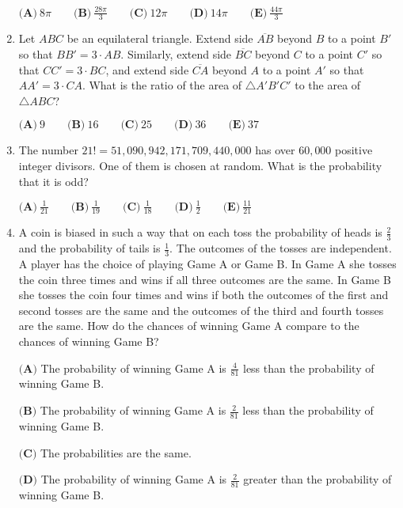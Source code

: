 \documentclass{article}
\begin{document}
\begin{enumerate}[label=\arabic*., itemsep=0.5em]
\(\textbf{(A)}\ 8\pi \qquad \textbf{(B)}\ \frac{28\pi}{3} \qquad \textbf{(C)}\ 12\pi \qquad \textbf{(D)}\ 14\pi \qquad \textbf{(E)}\ \frac{44\pi}{3}\)\par \vspace{0.5em}\item Let \(ABC\) be an equilateral triangle. Extend side \(\overline{AB}\) beyond \(B\) to a point \(B'\) so that \(BB'=3 \cdot AB\). Similarly, extend side \(\overline{BC}\) beyond \(C\) to a point \(C'\) so that \(CC'=3 \cdot BC\), and extend side \(\overline{CA}\) beyond \(A\) to a point \(A'\) so that \(AA'=3 \cdot CA\). What is the ratio of the area of \(\triangle A'B'C'\) to the area of \(\triangle ABC\)?

\(\textbf{(A)}\ 9\qquad\textbf{(B)}\ 16\qquad\textbf{(C)}\ 25\qquad\textbf{(D)}\ 36\qquad\textbf{(E)}\ 37\)\par \vspace{0.5em}\item The number \(21!=51,090,942,171,709,440,000\) has over \(60,000\) positive integer divisors. One of them is chosen at random. What is the probability that it is odd?

\(\textbf{(A)}\ \frac{1}{21} \qquad \textbf{(B)}\ \frac{1}{19} \qquad \textbf{(C)}\ \frac{1}{18} \qquad \textbf{(D)}\ \frac{1}{2} \qquad \textbf{(E)}\ \frac{11}{21}\)\par \vspace{0.5em}\item A coin is biased in such a way that on each toss the probability of heads is \(\frac{2}{3}\) and the probability of tails is \(\frac{1}{3}\). The outcomes of the tosses are independent. A player has the choice of playing Game A or Game B. In Game A she tosses the coin three times and wins if all three outcomes are the same. In Game B she tosses the coin four times and wins if both the outcomes of the first and second tosses are the same and the outcomes of the third and fourth tosses are the same. How do the chances of winning Game A compare to the chances of winning Game B?

\(\textbf{(A)}\) The probability of winning Game A is \(\frac{4}{81}\) less than the probability of winning Game B.

\(\textbf{(B)}\) The probability of winning Game A is \(\frac{2}{81}\) less than the probability of winning Game B.

\(\textbf{(C)}\) The probabilities are the same.

\(\textbf{(D)}\) The probability of winning Game A is \(\frac{2}{81}\) greater than the probability of winning Game B.


\end{enumerate}
\end{document}
